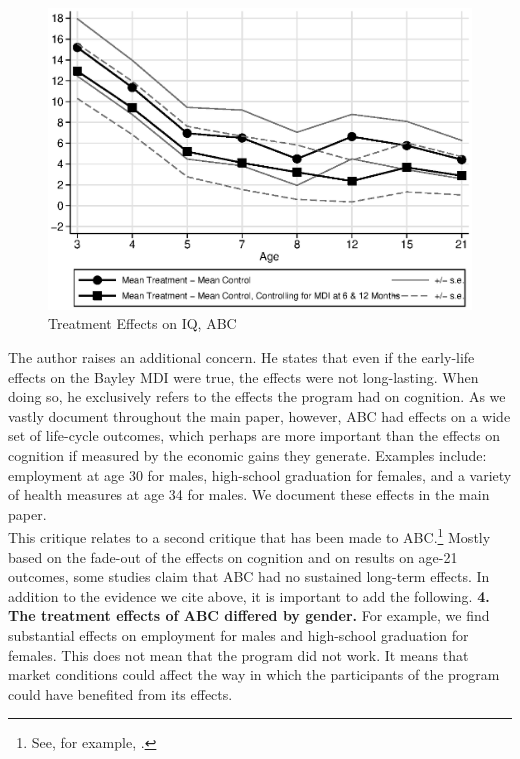 \begin{appendices}
\begin{figure}[H]
		\caption{Treatment Effects on IQ, ABC} \label{fig:treatiqsabc}
		\includegraphics[width=.9\columnwidth]{output/abc_mdifixing_2.eps}
\end{figure}

\noindent The author raises an additional concern. He states that even if the early-life effects on the Bayley MDI were true, the effects were not long-lasting. When doing so, he exclusively refers to the effects the program had on cognition. As we vastly document throughout the main paper, however, ABC had effects on a wide set of life-cycle outcomes, which perhaps are more important than the effects on cognition if measured by the economic gains they generate. Examples include: employment at age 30 for males, high-school graduation for females, and a variety of health measures at age 34 for males. We document these effects in the main paper.\\

\noindent This critique relates to a second critique that has been made to ABC.\footnote{See, for example, \citet{Besharov-etal_2011_ABCProject}.} Mostly based on the fade-out of the effects on cognition and on results on age-21 outcomes, some studies claim that ABC had no sustained long-term effects. In addition to the evidence we cite above, it is important to add the following. \textbf{4. The treatment effects of ABC differed by gender.} For example, we find substantial effects on employment for males and high-school graduation for females. This does not mean that the program did not work. It means that market conditions could affect the way in which the participants of the program could have benefited from its effects.\\


\end{appendices}
